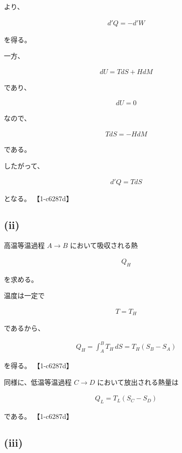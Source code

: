 \documentclass[platex,dvipdfmx,a4paper]{jsarticle}
\begin{document}
より、

\begin{align*}
d'Q=-d'W
\end{align*}

を得る。

一方、

\begin{align*}
dU
=
TdS+HdM
\end{align*}

であり、

\begin{align*}
dU=0
\end{align*}

なので、

\begin{align*}
TdS=-HdM
\end{align*}

である。

したがって、

\begin{align*}
d'Q=TdS
\end{align*}

となる。 【1-c6287d】

\subsection{(ii)}

高温等温過程 $A\to B$ において吸収される熱

\begin{align*}
Q_H
\end{align*}

を求める。

温度は一定で

\begin{align*}
T=T_H
\end{align*}

であるから、

\begin{align*}
Q_H
=
\int_A^B T_H\,dS
=
T_H(S_B-S_A)
\end{align*}

を得る。 【1-c6287d】

同様に、低温等温過程 $C\to D$ において放出される熱量は

\begin{align*}
Q_L
=
T_L(S_C-S_D)
\end{align*}

である。 【1-c6287d】

\subsection{(iii)}
\end{document}
